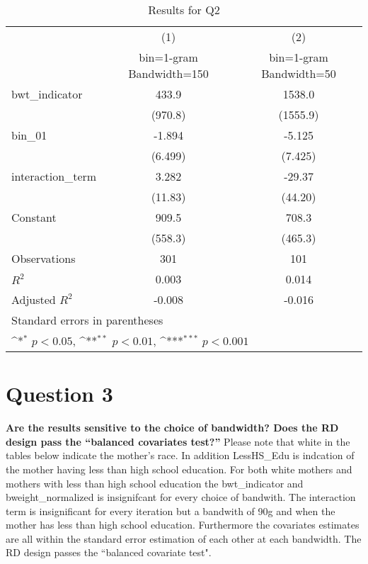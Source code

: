 \documentclass{article}
\begin{document}
\begin{table}[H]\centering
\def\sym#1{\ifmmode^{#1}\else\(^{#1}\)\fi}
\caption{Results for Q2 \label{q2}}
\begin{tabular}{l*{2}{c}}
\toprule
                    &\multicolumn{1}{c}{(1)}&\multicolumn{1}{c}{(2)}\\
                    &\multicolumn{1}{c}{bin=1-gram Bandwidth=150}&\multicolumn{1}{c}{bin=1-gram Bandwidth=50}\\
\midrule
bwt\_indicator       &       433.9         &      1538.0         \\
                    &     (970.8)         &    (1555.9)         \\
\addlinespace
bin\_01              &      -1.894         &      -5.125         \\
                    &     (6.499)         &     (7.425)         \\
\addlinespace
interaction\_term    &       3.282         &      -29.37         \\
                    &     (11.83)         &     (44.20)         \\
\addlinespace
Constant            &       909.5         &       708.3         \\
                    &     (558.3)         &     (465.3)         \\
\midrule
Observations        &         301         &         101         \\
\(R^{2}\)           &       0.003         &       0.014         \\
Adjusted \(R^{2}\)  &      -0.008         &      -0.016         \\
\bottomrule
\multicolumn{3}{l}{\footnotesize Standard errors in parentheses}\\
\multicolumn{3}{l}{\footnotesize \sym{*} \(p<0.05\), \sym{**} \(p<0.01\), \sym{***} \(p<0.001\)}\\
\end{tabular}
\end{table}


\section*{Question 3}

\textbf{Are  the  results  sensitive  to  the  choice  of  bandwidth?   Does  the  RD  design  pass  the  “balanced covariates test?”}
\newline \newline
Please note that white in the tables below indicate the mother's race. In addition LessHS\_Edu is indcation of the mother having less than high school education. For both white mothers and mothers with less than high school education the bwt\_indicator and bweight\_normalized is insignifcant for every choice of bandwith. The interaction term is insignificant for every iteration but a bandwith of 90g and when the mother has less than high school education. Furthermore the covariates estimates are all within the standard error estimation of each other at each bandwidth. The RD design passes the “balanced covariate test".
\end{document}
